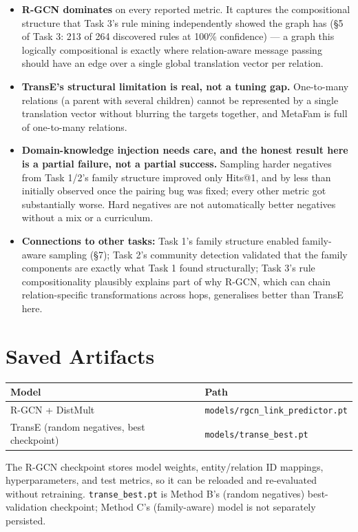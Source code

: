 \documentclass[11pt,a4paper]{article}
\begin{document}
\begin{itemize}[leftmargin=1.4em,itemsep=3pt]
\item \textbf{R-GCN dominates} on every reported metric. It captures the
      compositional structure that Task 3's rule mining independently
      showed the graph has (\S5 of Task 3: 213 of 264 discovered rules at
      100\% confidence) --- a graph this logically compositional is
      exactly where relation-aware message passing should have an edge
      over a single global translation vector per relation.
\item \textbf{TransE's structural limitation is real, not a tuning gap.}
      One-to-many relations (a parent with several children) cannot be
      represented by a single translation vector without blurring the
      targets together, and MetaFam is full of one-to-many relations.
\item \textbf{Domain-knowledge injection needs care, and the honest
      result here is a partial failure, not a partial success.} Sampling
      harder negatives from Task 1/2's family structure improved only
      Hits@1, and by less than initially observed once the pairing bug
      was fixed; every other metric got substantially worse. Hard
      negatives are not automatically better negatives without a mix or
      a curriculum.
\item \textbf{Connections to other tasks:} Task 1's family structure
      enabled family-aware sampling (\S7); Task 2's community detection
      validated that the family components are exactly what Task 1 found
      structurally; Task 3's rule compositionality plausibly explains
      part of why R-GCN, which can chain relation-specific
      transformations across hops, generalises better than TransE here.
\end{itemize}

\section{Saved Artifacts}

\begin{center}
\begin{tabular}{ll}
\toprule
\textbf{Model} & \textbf{Path} \\
\midrule
R-GCN + DistMult & \texttt{models/rgcn\_link\_predictor.pt} \\
TransE (random negatives, best checkpoint) & \texttt{models/transe\_best.pt} \\
\bottomrule
\end{tabular}
\end{center}

The R-GCN checkpoint stores model weights, entity/relation ID mappings,
hyperparameters, and test metrics, so it can be reloaded and re-evaluated
without retraining. \texttt{transe\_best.pt} is Method B's (random
negatives) best-validation checkpoint; Method C's (family-aware) model is
not separately persisted.
\end{document}
